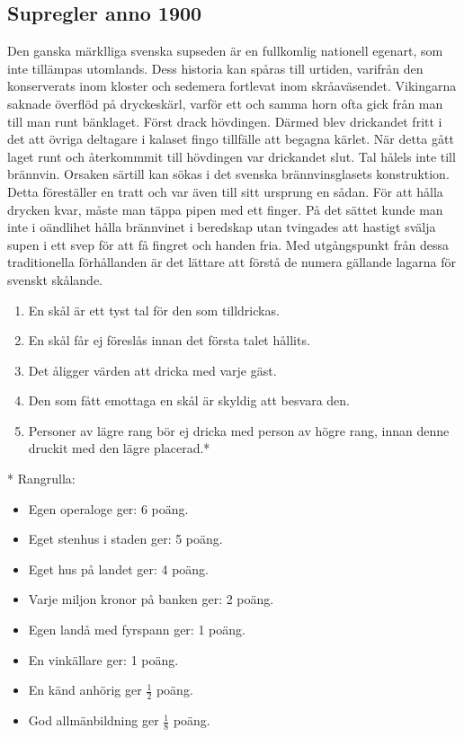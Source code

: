 \newpage
\begin{flushleft}
\section{Supregler anno 1900}
\end{flushleft}
{\large
Den ganska märklliga svenska supseden är en fullkomlig nationell egenart, som inte tillämpas utomlands.
Dess historia kan spåras till urtiden, varifrån den konserverats inom kloster och sedemera fortlevat inom skråaväsendet.
Vikingarna saknade överflöd på dryckeskärl, varför ett och samma horn ofta gick från man till man runt bänklaget.
Först drack hövdingen.
Därmed blev drickandet fritt i det att övriga deltagare i kalaset fingo tillfälle att begagna kärlet.
När detta gått laget runt och återkommmit till hövdingen var drickandet slut.
Tal hålels inte till brännvin.
Orsaken särtill kan sökas i det svenska brännvinsglasets konstruktion.
Detta föreställer en tratt och var även till sitt ursprung en sådan.
För att hålla drycken kvar, måste man täppa pipen med ett finger.
På det sättet kunde man inte i oändlihet hålla brännvinet i beredskap
utan tvingades att hastigt svälja supen i ett svep för att få fingret och handen fria.
Med utgångspunkt från dessa traditionella förhållanden
är det lättare att förstå de numera gällande lagarna för svenskt skålande.
\begin{enumerate}
\item En skål är ett tyst tal för den som tilldrickas.
\item En skål får ej föreslås innan det första talet hållits.
\item Det åligger värden att dricka med varje gäst.
\item Den som fått emottaga en skål är skyldig att besvara den.
\item Personer av lägre rang bör ej dricka med person av högre rang,
innan denne druckit med den lägre placerad.*
\end{enumerate}
\newpage

* Rangrulla:
\begin{itemize}
    \item Egen operaloge ger: 6 poäng.
    \item Eget stenhus i staden ger: 5 poäng.
    \item Eget hus på landet ger: 4 poäng.
    \item Varje miljon kronor på banken ger: 2 poäng.
    \item Egen landå med fyrspann ger: 1 poäng.
    \item En vinkällare ger: 1 poäng.
    \item En känd anhörig ger $\frac{1}{2}$ poäng.
    \item God allmänbildning ger $\frac{1}{8}$ poäng.
\end{itemize}
}


